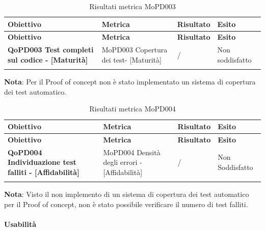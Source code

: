 \documentclass[../piano-di-qualifica.tex]{subfiles}
\begin{document}
\renewcommand{\arraystretch}{2} %
\begin{longtable}[H]{>{\centering\bfseries}m{5cm} >{\centering}m{5cm} >{\centering}m{2.5cm} >{\centering\arraybackslash}m{2.5cm}}  
  \rowcolor{lightgray}
  {\textbf{Obiettivo}} & {\textbf{Metrica}} & {\textbf{Risultato}} & {\textbf{Esito}}  \\
  \endfirsthead%
  \rowcolor{lightgray}
  {\textbf{Obiettivo}} & {\textbf{Metrica}} & {\textbf{Risultato}} & {\textbf{Esito}}  \\
  \endhead%
  \textbf{QoPD003 Test completi sul codice - [Maturità]} & MoPD003 Copertura dei test- [Maturità] & / & Non soddisfatto \\
  \caption{Risultati metrica MoPD003}
  \label{tab:my-table}
\end{longtable}
\textbf{Nota}: Per il Proof of concept non è stato implementato un sistema di copertura dei test automatico.

\renewcommand{\arraystretch}{2} %
\begin{longtable}[H]{>{\centering\bfseries}m{5cm} >{\centering}m{5cm} >{\centering}m{2.5cm} >{\centering\arraybackslash}m{2.5cm}}  
  \rowcolor{lightgray}
  {\textbf{Obiettivo}} & {\textbf{Metrica}} & {\textbf{Risultato}} & {\textbf{Esito}}  \\
  \endfirsthead%
  \rowcolor{lightgray}
  {\textbf{Obiettivo}} & {\textbf{Metrica}} & {\textbf{Risultato}} & {\textbf{Esito}}  \\
  \endhead%
  \textbf{QoPD004 Individuazione test falliti - [Affidabilità]} & MoPD004 Densità degli errori - [Affidabilità] & / & Non Soddisfatto \\
  \caption{Risultati metrica MoPD004}
  \label{tab:my-table}
\end{longtable}
\textbf{Nota}: Visto il non implemento di un sistema di copertura dei test automatico per il Proof of concept, non è stato possibile verificare il numero di test falliti.

\paragraph{Usabilità}
\label{sub:usabilita}
\end{document}
